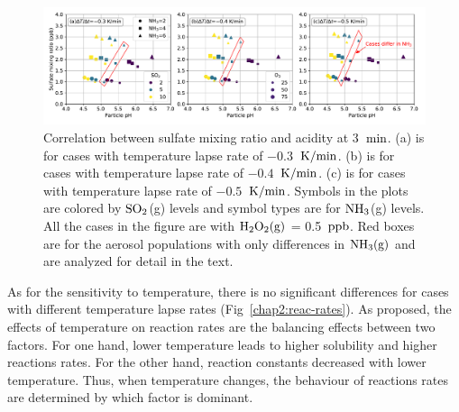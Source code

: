 \documentclass[edeposit,fullpage]{uiucthesis2009}
\makeatletter
\DeclareRobustCommand*\unit[1]
 {\ensuremath{%
   {\thinmuskip3mu\relax
    \def\mu{\text{\textmu}}\def~{\,}%
    \ifx\f@series\testbx\mathbf{#1}\else\mathrm{#1}\fi}}}
\makeatother
\begin{document}
\begin{figure}[ht]
    \centering \includegraphics[scale=0.55]{chap2_figs/chap2_fig4_sulfate_pH_3min.pdf}
    \caption{Correlation between sulfate mixing ratio and acidity at 3~\unit{min}. (a) is for cases with temperature lapse rate of $-0.3$~\unit{K/min}. (b) is for cases with temperature lapse rate of $-0.4$~\unit{K/min}. (c) is for cases with temperature lapse rate of $-0.5$~\unit{K/min}. Symbols in the plots are colored by $\rm SO_2$(g) levels and symbol types are for $\rm NH_3$(g) levels. All the cases in the figure are with $\rm H_2O_2(g)$ = 0.5~\unit{ppb}. Red boxes are for the aerosol populations with only differences in $\rm NH_3(g)$ and are analyzed for detail in the text.}
    \label{chap2:su-acidity}
\end{figure}

As for the sensitivity to temperature, there is no significant differences for cases with different temperature lapse rates (Fig~\ref{chap2:reac-rates}). As \citet{Seinfeld2016} proposed, the effects of temperature on reaction rates are the balancing effects between two factors. For one hand, lower temperature leads to higher solubility and higher reactions rates. For the other hand, reaction constants decreased with lower temperature. Thus, when temperature changes, the behaviour of reactions rates are determined by which factor is dominant. 
\end{document}
